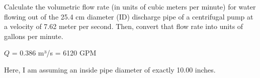 

Calculate the volumetric flow rate (in units of cubic meters per minute) for water flowing out of the 25.4 cm diameter (ID) discharge pipe of a centrifugal pump at a velocity of 7.62 meter per second.  Then, convert that flow rate into units of gallons per minute.







$Q$ = 0.386 m³/s = 6120 GPM







Here, I am assuming an inside pipe diameter of exactly 10.00 inches.




